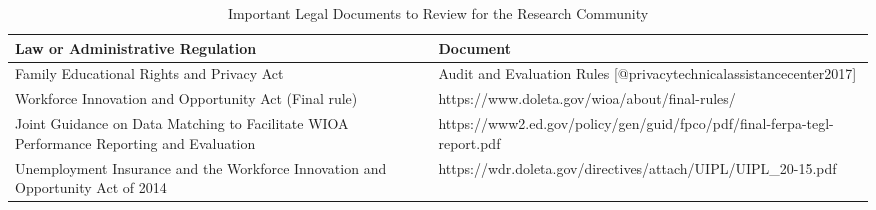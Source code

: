 \begin{table}[htb]

\caption{\label{tab:oldatable3}Important Legal Documents to Review for the Research Community}
\centering
\begin{tabulary}{1.0\textwidth}{LL}
\hline
Law or Administrative Regulation & Document\\
\hline
Family Educational Rights and Privacy Act & Audit and Evaluation Rules [@privacytechnicalassistancecenter2017]\\
\hline
Workforce Innovation and Opportunity Act (Final rule) & https://www.doleta.gov/wioa/about/final-rules/\\
\hline
Joint Guidance on Data Matching to Facilitate WIOA Performance Reporting and Evaluation & https://www2.ed.gov/policy/gen/guid/fpco/pdf/final-ferpa-tegl-report.pdf\\
\hline
Unemployment Insurance and the Workforce Innovation and Opportunity Act of 2014 & https://wdr.doleta.gov/directives/attach/UIPL/UIPL\_20-15.pdf\\
\hline
\end{tabulary}
\end{table}

